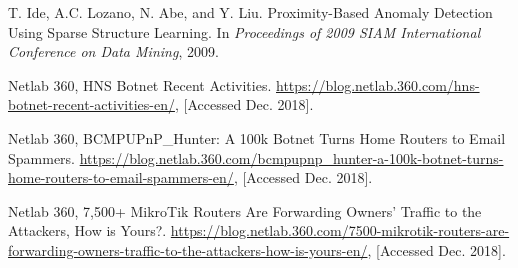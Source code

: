 \documentclass[conference]{IEEEtran}
\begin{document}
\begin{thebibliography}{99}
T. Ide, A.C. Lozano, N. Abe, and Y. Liu. Proximity-Based Anomaly Detection Using Sparse Structure Learning. In {\it Proceedings of 2009 SIAM International Conference on Data Mining}, 2009.

Netlab 360, HNS Botnet Recent Activities. \url{https://blog.netlab.360.com/hns-botnet-recent-activities-en/}, [Accessed Dec. 2018].

Netlab 360, BCMPUPnP\_Hunter: A 100k Botnet Turns Home Routers to Email Spammers. \url{https://blog.netlab.360.com/bcmpupnp_hunter-a-100k-botnet-turns-home-routers-to-email-spammers-en/}, [Accessed Dec. 2018].

Netlab 360, 7,500+ MikroTik Routers Are Forwarding Owners’ Traffic to the Attackers, How is Yours?. \url{https://blog.netlab.360.com/7500-mikrotik-routers-are-forwarding-owners-traffic-to-the-attackers-how-is-yours-en/}, [Accessed Dec. 2018].


\end{thebibliography}
\end{document}
